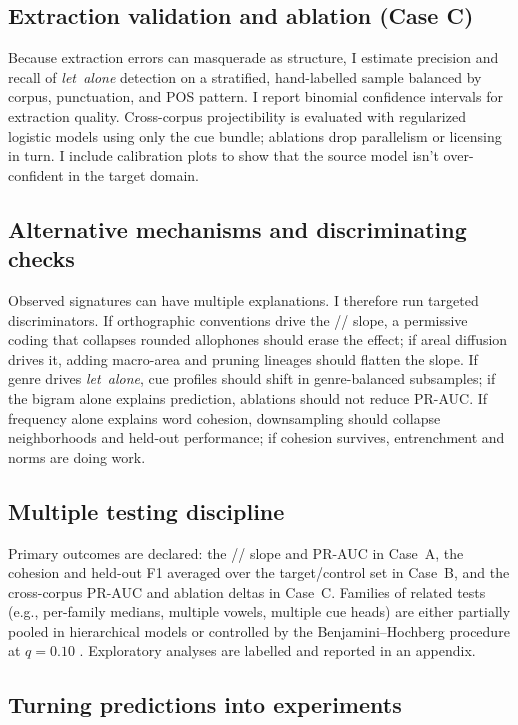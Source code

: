 \documentclass[12pt]{article}
\begin{document}
\subsection*{Extraction validation and ablation (Case C)}

Because extraction errors can masquerade as structure, I estimate precision and recall of \emph{let~alone} detection on a stratified, hand-labelled sample balanced by corpus, punctuation, and POS pattern. I report binomial confidence intervals for extraction quality. Cross-corpus projectibility is evaluated with regularized logistic models using only the cue bundle; ablations drop parallelism or licensing in turn. I include calibration plots to show that the source model isn't over-confident in the target domain.

\subsection*{Alternative mechanisms and discriminating checks}

Observed signatures can have multiple explanations. I therefore run targeted discriminators. If orthographic conventions drive the // slope, a permissive coding that collapses rounded allophones should erase the effect; if areal diffusion drives it, adding macro-area and pruning lineages should flatten the slope. If genre drives \emph{let~alone}, cue profiles should shift in genre-balanced subsamples; if the bigram alone explains prediction, ablations should not reduce PR-AUC. If frequency alone explains word cohesion, downsampling should collapse neighborhoods and held-out performance; if cohesion survives, entrenchment and norms are doing work.

\subsection*{Multiple testing discipline}

Primary outcomes are declared: the // slope and PR-AUC in Case~A, the cohesion and held-out F1 averaged over the target/control set in Case~B, and the cross-corpus PR-AUC and ablation deltas in Case~C. Families of related tests (e.g., per-family medians, multiple vowels, multiple cue heads) are either partially pooled in hierarchical models or controlled by the Benjamini–Hochberg procedure at $q=0.10$ \citep{BenjaminiHochberg1995}. Exploratory analyses are labelled and reported in an appendix.

\subsection*{Turning predictions into experiments}
\end{document}
